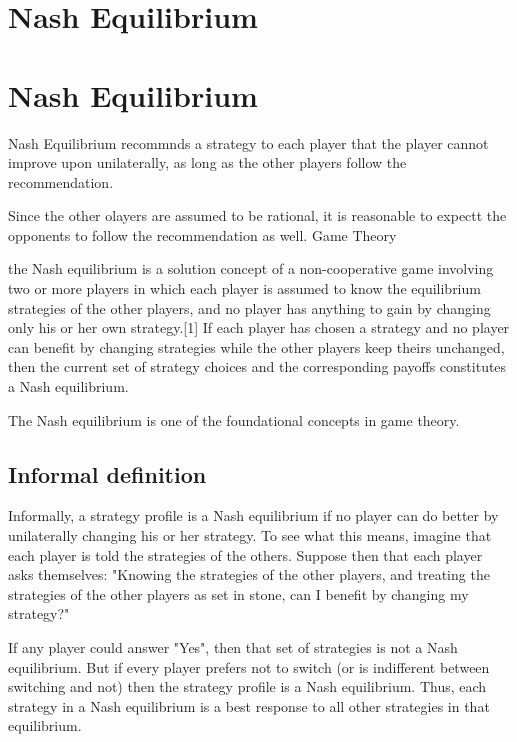 \documentclass[a4paper,12pt]{article}
\begin{document}
\section{Nash Equilibrium}


\newpage
\section{Nash Equilibrium}

Nash Equilibrium recommnds a strategy to each player that the player cannot improve upon unilaterally, as long as the other players follow the recommendation.

Since the other olayers are assumed to be rational, it is reasonable to expectt the opponents to follow the recommendation as well.
Game Theory


the Nash equilibrium is a solution concept of a non-cooperative game involving two or more players in which each player is assumed to know the equilibrium strategies of the other players, and no player has anything to gain by changing only his or her own strategy.[1] If each player has chosen a strategy and no player can benefit by changing strategies while the other players keep theirs unchanged, then the current set of strategy choices and the corresponding payoffs constitutes a Nash equilibrium. 

The Nash equilibrium is one of the foundational concepts in game theory.



\subsection{Informal definition}
Informally, a strategy profile is a Nash equilibrium if no player can do better by unilaterally changing his or her strategy. To see what this means, imagine that each player is told the strategies of the others. Suppose then that each player asks themselves: "Knowing the strategies of the other players, and treating the strategies of the other players as set in stone, can I benefit by changing my strategy?"

If any player could answer "Yes", then that set of strategies is not a Nash equilibrium. But if every player prefers not to switch (or is indifferent between switching and not) then the strategy profile is a Nash equilibrium. Thus, each strategy in a Nash equilibrium is a best response to all other strategies in that equilibrium.
\end{document}
